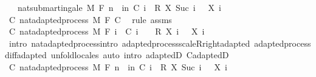 \begin{isabellebody}
\ \ \ {\isachardoublequoteopen}nat{\isacharunderscore}{\kern0pt}submartingale\ M\ F\ {\isacharparenleft}{\kern0pt}{\isasymlambda}n\ {\isasymxi}{\isachardot}{\kern0pt}\ {\isasymSum}i{\isacharless}{\kern0pt}n{\isachardot}{\kern0pt}\ C\ i\ {\isasymxi}\ {\isacharasterisk}{\kern0pt}\isactrlsub R\ {\isacharparenleft}{\kern0pt}X\ {\isacharparenleft}{\kern0pt}Suc\ i{\isacharparenright}{\kern0pt}\ {\isasymxi}\ {\isacharminus}{\kern0pt}\ X\ i\ {\isasymxi}{\isacharparenright}{\kern0pt}{\isacharparenright}{\kern0pt}{\isachardoublequoteclose}\isanewline
%
\isadelimproof
%
\endisadelimproof
%
\isatagproof
{}\isamarkupfalse%
{\isacharminus}{\kern0pt}\isanewline
\ \ \isamarkupfalse%
\ C{\isacharcolon}{\kern0pt}\ nat{\isacharunderscore}{\kern0pt}adapted{\isacharunderscore}{\kern0pt}process\ M\ F\ C\ \isamarkupfalse%
\ {\isacharparenleft}{\kern0pt}rule\ assms{\isacharparenright}{\kern0pt}\isanewline
\ \ \isamarkupfalse%
\ C{\isacharprime}{\kern0pt}{\isacharcolon}{\kern0pt}\ nat{\isacharunderscore}{\kern0pt}adapted{\isacharunderscore}{\kern0pt}process\ M\ F\ {\isachardoublequoteopen}{\isasymlambda}i\ {\isasymxi}{\isachardot}{\kern0pt}\ C\ {\isacharparenleft}{\kern0pt}i\ {\isacharminus}{\kern0pt}\ {}{\isacharparenright}{\kern0pt}\ {\isasymxi}\ {\isacharasterisk}{\kern0pt}\isactrlsub R\ {\isacharparenleft}{\kern0pt}X\ i\ {\isasymxi}\ {\isacharminus}{\kern0pt}\ X\ {\isacharparenleft}{\kern0pt}i\ {\isacharminus}{\kern0pt}\ {}{\isacharparenright}{\kern0pt}\ {\isasymxi}{\isacharparenright}{\kern0pt}{\isachardoublequoteclose}\ \isamarkupfalse%
\ {\isacharparenleft}{\kern0pt}intro\ nat{\isacharunderscore}{\kern0pt}adapted{\isacharunderscore}{\kern0pt}process{\isachardot}{\kern0pt}intro\ adapted{\isacharunderscore}{\kern0pt}process{\isachardot}{\kern0pt}scaleR{\isacharunderscore}{\kern0pt}right{\isacharunderscore}{\kern0pt}adapted\ adapted{\isacharunderscore}{\kern0pt}process{\isachardot}{\kern0pt}diff{\isacharunderscore}{\kern0pt}adapted{\isacharcomma}{\kern0pt}\ unfold{\isacharunderscore}{\kern0pt}locales{\isacharparenright}{\kern0pt}\ {\isacharparenleft}{\kern0pt}auto\ intro{\isacharcolon}{\kern0pt}\ adaptedD\ C{\isachardot}{\kern0pt}adaptedD{\isacharparenright}{\kern0pt}{\isacharplus}{\kern0pt}\isanewline
\ \ \isamarkupfalse%
\ C{\isacharprime}{\kern0pt}{\isacharprime}{\kern0pt}{\isacharcolon}{\kern0pt}\ nat{\isacharunderscore}{\kern0pt}adapted{\isacharunderscore}{\kern0pt}process\ M\ F\ {\isachardoublequoteopen}{\isasymlambda}n\ {\isasymxi}{\isachardot}{\kern0pt}\ {\isasymSum}i{\isacharless}{\kern0pt}n{\isachardot}{\kern0pt}\ C\ i\ {\isasymxi}\ {\isacharasterisk}{\kern0pt}\isactrlsub R\ {\isacharparenleft}{\kern0pt}X\ {\isacharparenleft}{\kern0pt}Suc\ i{\isacharparenright}{\kern0pt}\ {\isasymxi}\ {\isacharminus}{\kern0pt}\ X\ i\ {\isasymxi}{\isacharparenright}{\kern0pt}{\isachardoublequoteclose}\ \isamarkupfalse%

\end{isabellebody}
